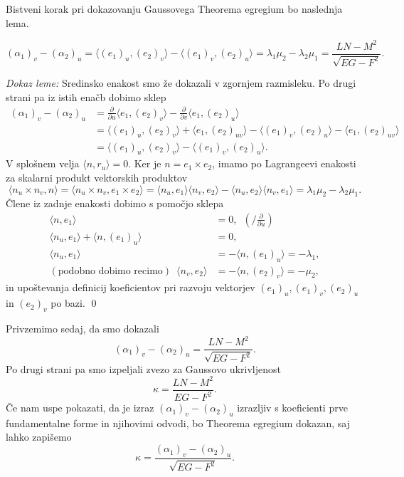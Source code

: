 Bistveni korak pri dokazovanju Gaussovega Theorema egregium bo naslednja lema.
\begin{lema}
\begin{equation*}
(\alpha_1)_v - (\alpha_2)_u = \langle  (e_1)_u, (e_2)_v \rangle - \langle (e_1)_v , (e_2)_u \rangle  = \lambda_1 \mu_2 - \lambda_2 \mu_1 =  \frac{LN - M^2}{\sqrt{EG - F^2} }.
\end{equation*}  
\end{lema}

\noindent
{\em Dokaz leme:\/}
Sredinsko enakost smo že dokazali v zgornjem razmisleku. Po drugi strani pa iz istih enačb dobimo sklep \begin{align*}
    (\alpha_1)_v - (\alpha_2)_u &= \frac{ \partial  }{ \partial u }  \langle e_1, (e_2)_v \rangle - \frac{ \partial  }{ \partial v}  \langle e_1, (e_2)_u \rangle \\
     &= \langle  (e_1)_u, (e_2)_v \rangle + \langle  e_1, (e_2)_{uv} \rangle  - \langle  (e_1)_v, (e_2)_u \rangle - \langle  e_1, (e_2)_{uv} \rangle \\
     &= \langle  (e_1)_u, (e_2)_v \rangle - \langle  (e_1)_v, (e_2)_u \rangle.
\end{align*}  
V splošnem velja $\langle n, r_u \rangle = 0$. Ker je $n = e_1 \times  e_2$, imamo po Lagrangeevi enakosti za skalarni produkt vektorskih produktov \begin{equation*}
\langle n_u \times n_v, n \rangle = \langle n_u \times  n_v, e_1 \times e_2 \rangle = \langle n_u, e_1 \rangle \langle n_v, e_2 \rangle - \langle n_u, e_2 \rangle \langle n_v, e_1 \rangle = \lambda_1 \mu_2 - \lambda_2 \mu_1. 
\end{equation*}  
Člene iz zadnje enakosti dobimo s pomočjo sklepa \begin{align*}
     \langle n, e_1 \rangle &= 0, \,\,\, \left(\bigg/ \frac{ \partial  }{ \partial u } \right) \\
     \langle n_u, e_1 \rangle + \langle  n, (e_1)_u \rangle  &= 0, \\
     \langle n_u, e_1 \rangle &= - \langle n, (e_1)_u \rangle = - \lambda_1, \\
     (\text{podobno dobimo recimo}) \,\,\, \langle n_v, e_2 \rangle &= - \langle n, (e_2)_v \rangle = -\mu_2,   
\end{align*}
in upoštevanja definicij koeficientov pri razvoju vektorjev $(e_1)_u, (e_1)_v, (e_2)_u$ in $(e_2)_v$ po bazi.
\qed

Privzemimo sedaj, da smo dokazali \begin{equation*}
(\alpha_1)_v - (\alpha_2)_u = \frac{LN - M^2}{\sqrt{EG - F^2}}.  
\end{equation*}  
 Po drugi strani pa smo izpeljali zvezo za Gaussovo ukrivljenost \begin{equation*}
    \kappa = \frac{LN - M^2}{EG - F^2}.
 \end{equation*}  
Če nam uspe pokazati, da je izraz $(\alpha_1)_v - (\alpha_2)_u$ izrazljiv s koeficienti prve fundamentalne forme in njihovimi odvodi, bo Theorema egregium dokazan, saj lahko zapišemo \begin{equation*}
\kappa = \frac{(\alpha_1)_v - (\alpha_2)_u}{\sqrt{EG - F^2}}.
\end{equation*}  


